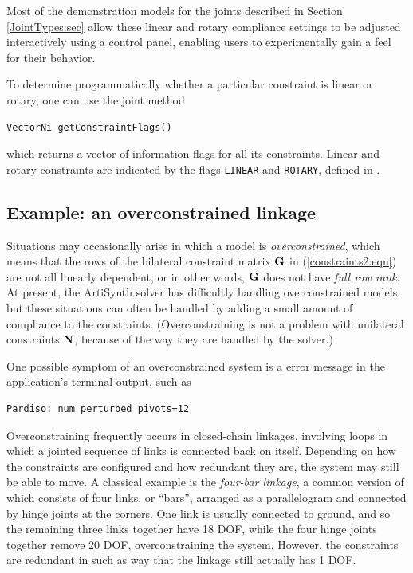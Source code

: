 Most of the demonstration models for the joints described in
Section \ref{JointTypes:sec} allow these linear and rotary compliance
settings to be adjusted interactively using a control panel, enabling
users to experimentally gain a feel for their behavior.

To determine programmatically whether a particular constraint is linear
or rotary, one can use the joint method
%
\begin{lstlisting}[]
  VectorNi getConstraintFlags()
\end{lstlisting}
%
which returns a vector of information flags for all its constraints.
Linear and rotary constraints are indicated by the flags {\tt LINEAR}
and {\tt ROTARY}, defined in 
.

\subsection{Example: an overconstrained linkage}
\label{FourBar:sec}

Situations may occasionally arise in which a model is {\it
overconstrained}, which means that the rows of the bilateral
constraint matrix ${\bf G}$ in (\ref{constraints2:eqn}) are not all
linearly dependent, or in other words, ${\bf G}$ does not have {\it full
row rank}. At present, the ArtiSynth solver has difficultly handling
overconstrained models, but these situations can often be handled by
adding a small amount of compliance to the
constraints. (Overconstraining is not a problem with unilateral
constraints ${\bf N}$, because of the way they are handled by the solver.)

One possible symptom of an overconstrained system is a error message
in the application's terminal output, such as
%
\begin{verbatim}
Pardiso: num perturbed pivots=12
\end{verbatim}

Overconstraining frequently occurs in closed-chain linkages, involving
loops in which a jointed sequence of links is connected back on
itself. Depending on how the constraints are configured and how
redundant they are, the system may still be able to move.  A classical
example is the {\it four-bar linkage}, a common version of which
consists of four links, or ``bars'', arranged as a parallelogram and
connected by hinge joints at the corners. One link is usually
connected to ground, and so the remaining three links together have 18
DOF, while the four hinge joints together remove 20 DOF,
overconstraining the system. However, the constraints are redundant in
such as way that the linkage still actually has 1 DOF.

